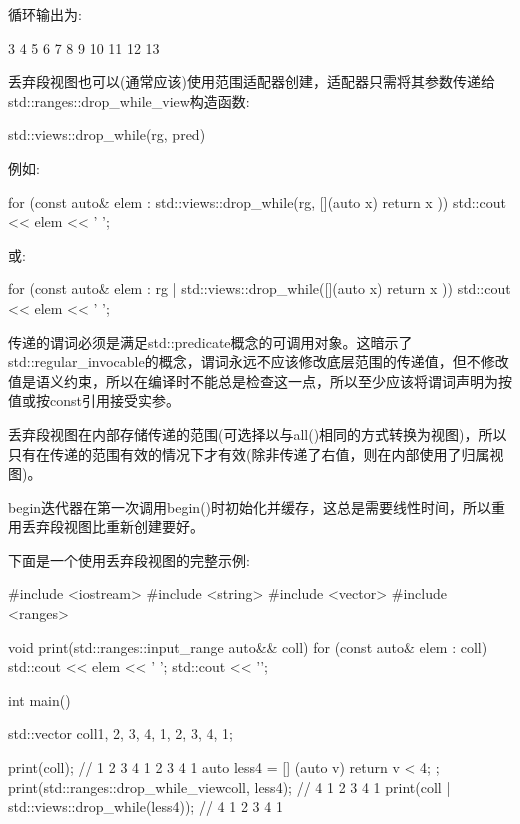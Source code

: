 循环输出为:

\begin{shell}
3 4 5 6 7 8 9 10 11 12 13
\end{shell}


丢弃段视图也可以(通常应该)使用范围适配器创建，适配器只需将其参数传递给std::ranges::drop\_while\_view构造函数:

\begin{cpp}
std::views::drop_while(rg, pred)
\end{cpp}

例如:

\begin{cpp}
for (const auto& elem : std::views::drop_while(rg, [](auto x) {
						return x %
					})) {
	std::cout << elem << ' ';
}
\end{cpp}

或:

\begin{cpp}
for (const auto& elem : rg | std::views::drop_while([](auto x) {
						return x %
					})) {
	std::cout << elem << ' ';
}
\end{cpp}

传递的谓词必须是满足std::predicate概念的可调用对象。这暗示了std::regular\_invocable的概念，谓词永远不应该修改底层范围的传递值，但不修改值是语义约束，所以在编译时不能总是检查这一点，所以至少应该将谓词声明为按值或按const引用接受实参。

丢弃段视图在内部存储传递的范围(可选择以与all()相同的方式转换为视图)，所以只有在传递的范围有效的情况下才有效(除非传递了右值，则在内部使用了归属视图)。

begin迭代器在第一次调用begin()时初始化并缓存，这总是需要线性时间，所以重用丢弃段视图比重新创建要好。

下面是一个使用丢弃段视图的完整示例:


\begin{cpp}
#include <iostream>
#include <string>
#include <vector>
#include <ranges>

void print(std::ranges::input_range auto&& coll)
{
	for (const auto& elem : coll) {
		std::cout << elem << ' ';
	}
	std::cout << '\n';
}

int main()
{
	std::vector coll{1, 2, 3, 4, 1, 2, 3, 4, 1};
	
	print(coll); // 1 2 3 4 1 2 3 4 1
	auto less4 = [] (auto v) { return v < 4; };
	print(std::ranges::drop_while_view{coll, less4}); // 4 1 2 3 4 1
	print(coll | std::views::drop_while(less4)); // 4 1 2 3 4 1
}
\end{cpp}

